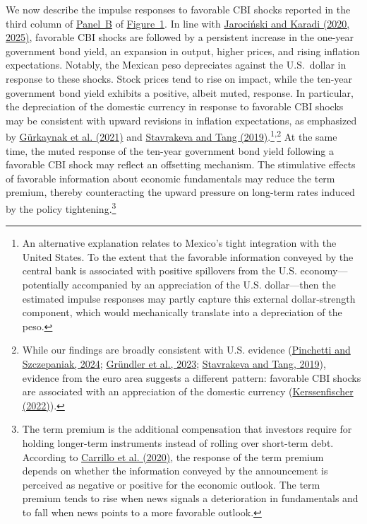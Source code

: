 \documentclass[\latexroot/\projectname]{subfiles}
\begin{document}
We now describe the impulse responses to favorable CBI shocks reported in the third column of \hyperlink{Panel BF1}{Panel~B} of \hyperlink{Figure~1}{Figure~1}. In line with \hyperlink{Jaroci\'{n}ski and Karadi (2025)}{Jaroci\'{n}ski and Karadi (2020, 2025)}, favorable CBI shocks are followed by a persistent increase in the one-year government bond yield, an expansion in output, higher prices, and rising inflation expectations. Notably, the Mexican peso depreciates against the U.S.\ dollar in response to these shocks. Stock prices tend to rise on impact, while the ten-year government bond yield exhibits a positive, albeit muted, response. In particular, the depreciation of the domestic currency in response to favorable CBI shocks may be consistent with upward revisions in inflation expectations, as emphasized by \hyperlink{Gurkaynak et al. (2021)}{G\"urkaynak et al. (2021)} and \hyperlink{Stavrakeva and Tang (2019)}{Stavrakeva and Tang (2019)}.\footnote{An alternative explanation relates to Mexico's tight integration with the United States. To the extent that the favorable information conveyed by the central bank is associated with positive spillovers from the U.S. economy---potentially accompanied by an appreciation of the U.S. dollar---then the estimated impulse responses may partly capture this external dollar-strength component, which would mechanically translate into a depreciation of the peso.}\textsuperscript{,}\footnote{While our findings are broadly consistent with U.S. evidence (\hyperlink{Pinchetti and Szczepaniak (2024)}{Pinchetti and Szczepaniak, 2024}; \hyperlink{Gr\"undler et al. (2023)}{Gr\"undler et al., 2023}; \hyperlink{Stavrakeva and Tang (2019)}{Stavrakeva and Tang, 2019}), evidence from the euro area suggests a different pattern: favorable CBI shocks are associated with an appreciation of the domestic currency (\hyperlink{Kerssenfischer (2022)}{Kerssenfischer (2022)}).}  At the same time, the muted response of the ten-year government bond yield following a favorable CBI shock may reflect an offsetting mechanism. The stimulative effects of favorable information about economic fundamentals may reduce the term premium, thereby counteracting the upward pressure on long-term rates induced by the policy tightening.\footnote{The term premium is the additional compensation that investors require for holding longer-term instruments instead of rolling over short-term debt. According to \hyperlink{Carrillo et al. (2020)}{Carrillo et al. (2020)}, the response of the term premium depends on whether the information conveyed by the announcement is perceived as negative or positive for the economic outlook. The term premium tends to rise when news signals a deterioration in fundamentals and to fall when news points to a more favorable outlook.}
\end{document}
